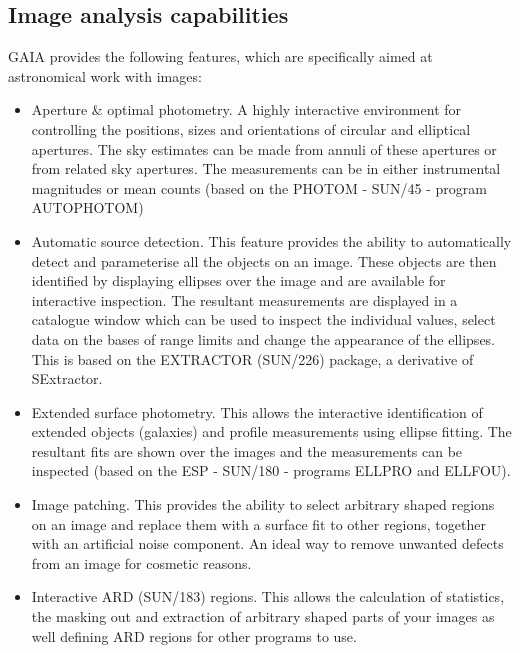 \documentclass[twoside,11pt]{article}
\newcommand{\xref}[3]{#1}
\newcommand{\xlabel}[1]{}
\renewcommand{\_}{\texttt{\symbol{95}}}
\begin{document}
\subsection{\xlabel{image_analysis_capabilities}Image analysis capabilities}
GAIA provides the following features, which are specifically aimed at
astronomical work with images:
\begin{itemize}
\item Aperture \& optimal photometry. A highly interactive environment
  for controlling the positions, sizes and orientations of circular
  and elliptical apertures. The sky estimates can be made from
  annuli of these apertures or from related sky apertures. The
  measurements can be in either instrumental magnitudes or
  mean counts (based on the PHOTOM - \xref{SUN/45}{sun45}{} -
  program \xref{AUTOPHOTOM}{sun45}{AUTOPHOTOM})

\item Automatic source detection. This feature provides the ability to
  automatically detect and parameterise all the objects on an
  image. These objects are then identified by displaying ellipses over
  the image and are available for interactive inspection. The resultant
  measurements are displayed in a catalogue window which can be used to
  inspect the individual values, select data on the bases of range
  limits and change the appearance of the ellipses. This is based on the
  EXTRACTOR (\xref{SUN/226}{sun226}{}) package, a derivative of
  SExtractor.

\item Extended surface photometry. This allows the interactive
  identification of extended objects (galaxies) and profile
  measurements using ellipse fitting. The resultant fits are shown
  over the images and the measurements can be inspected (based on the
  ESP - \xref{SUN/180}{sun180}{} - programs
  \xref{ELLPRO}{sun180}{ELLPRO} and \xref{ELLFOU}{sun180}{ELLFOU}).

\item Image patching. This provides the ability to select arbitrary
  shaped regions on an image and replace them with a surface fit
  to other regions, together with an artificial noise component.
  An ideal way to remove unwanted defects from an image for
  cosmetic reasons.

\item Interactive ARD (\xref{SUN/183}{sun183}{}) regions. This
  allows the calculation of statistics, the masking out and
  extraction of arbitrary shaped parts of your images as well
  defining ARD regions for other programs to use.


\end{itemize}
\end{document}
